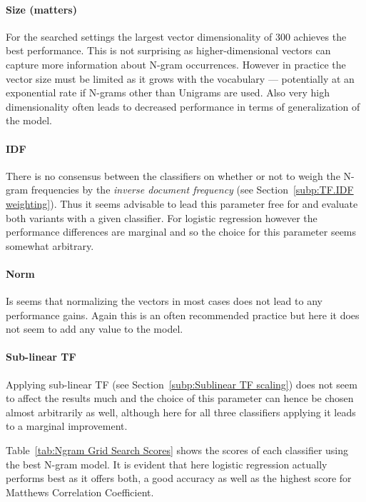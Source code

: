 \paragraph{Size (matters)}
\label{par:Size}
For the searched settings the largest vector dimensionality of 300 achieves the best performance. This is not surprising as higher-dimensional vectors can capture more information about N-gram occurrences. However in practice the vector size must be limited as it grows with the vocabulary --- potentially at an exponential rate if N-grams other than Unigrams are used. Also very high dimensionality often leads to decreased performance in terms of generalization of the model.

\paragraph{IDF}
\label{par:IDF}
There is no consensus between the classifiers on whether or not to weigh the N-gram frequencies by the \emph{inverse document frequency} (see Section~\ref{subp:TF.IDF weighting}). Thus it seems advisable to lead this parameter free for and evaluate both variants with a given classifier. For logistic regression however the performance differences are marginal and so the choice for this parameter seems somewhat arbitrary.

\paragraph{Norm}
\label{par:Norm}
Is seems that normalizing the vectors in most cases does not lead to any performance gains. Again this is an often recommended practice but here it does not seem to add any value to the model.


\paragraph{Sub-linear TF}
\label{par:Sub-linear TF}
Applying sub-linear TF (see Section~\ref{subp:Sublinear TF scaling}) does not seem to affect the results much and the choice of this parameter can hence be chosen almost arbitrarily as well, although here for all three classifiers applying it leads to a marginal improvement.

Table~\ref{tab:Ngram Grid Search Scores} shows the scores of each classifier using the best N-gram model. It is evident that here logistic regression actually performs best as it offers both, a good accuracy as well as the highest score for Matthews Correlation Coefficient.

